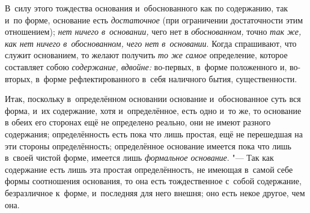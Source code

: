 В~силу этого тождества основания и~обоснованного как по содержанию, так и~по
форме, основание есть {\em достаточное} (при ограничении достаточности этим
отношением); {\em нет ничего в~основании,} чего нет в {\em обоснованном,} точно
{\em так же, как нет ничего в~обоснованном, чего нет в~основании}. Когда
спрашивают, что служит основанием, то желают получить {\em то же самое}
определение, которое составляет собою {\em содержание, вдвойне:} во-первых,
в~форме положенного и, во-вторых, в~форме рефлектированного в~себя наличного
бытия, существенности.

Итак, поскольку в~определённом основании основание и~обоснованное суть вся
форма, и~их содержание, хотя и~определённое, есть одно и~то же, то основание в
обеих его сторонах ещё не определено реально, они не имеют разного содержания;
определённость есть пока что лишь простая, ещё не перешедшая на эти стороны
определённость; определённое основание имеется пока что лишь в~своей чистой
форме, имеется лишь {\em формальное основание}. "--- Так как содержание есть
лишь эта простая определённость, не имеющая в~самой себе формы соотношения
основания, то она есть тождественное с~собой содержание, безразличное к~форме,
и~последняя для него внешня; оно есть некое другое, чем она.


